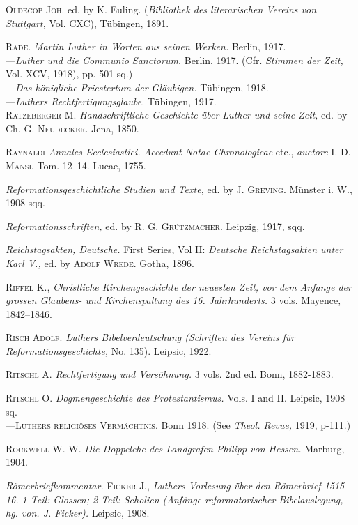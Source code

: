 \textsc{Oldecop Joh.} ed. by K. Euling. (\textit{Bibliothek des literarischen Vereins von
Stuttgart,} Vol. CXC), Tübingen, 1891.

\textsc{Rade.} \textit{Martin Luther in Worten aus seinen Werken.} Berlin, 1917. \\
---\textit{Luther und die Communio Sanctorum.} Berlin, 1917. (Cfr. \textit{Stimmen der
Zeit,} Vol. XCV, 1918), pp. 501 sq.) \\
---\textit{Das königliche Priestertum der Gläubigen.} Tübingen, 1918. \\
---\textit{Luthers Rechtfertigungsglaube.} Tübingen, 1917. \\

\textsc{Ratzeberger M.} \textit{Handschriftliche Geschichte über Luther und seine Zeit,}
ed. by Ch. \textsc{G. Neudecker.} Jena, 1850.

\textsc{Raynaldi} \textit{Annales Ecclesiastici. Accedunt Notae Chronologicae} etc., \textit{auctore}
\textsc{I. D. Mansi.} Tom. 12--14. Lucae, 1755.

\textit{Reformationsgeschichtliche Studien und Texte,} ed. by \textsc{J. Greving.} Münster i.
W., 1908 sqq.

\textit{Reformationsschriften,} ed. by \textsc{R. G. Grützmacher.} Leipzig, 1917, sqq.

\textit{Reichstagsakten, Deutsche.} First Series, Vol II: \textit{Deutsche Reichstagsakten
unter Karl V.,} ed. by \textsc{Adolf Wrede}. Gotha, 1896.

\textsc{Riffel K.}, \textit{Christliche Kirchengeschichte der neuesten Zeit, vor dem Anfange
der grossen Glaubens- und Kirchenspaltung des 16. Jahrhunderts.}
3 vols. Mayence, 1842--1846.

\textsc{Risch Adolf.} \textit{Luthers Bibelverdeutschung (Schriften des Vereins für Reformationsgeschichte,}
No. 135). Leipsic, 1922.

\textsc{Ritschl A.} \textit{Rechtfertigung und Versöhnung.} 3 vols. 2nd ed.
Bonn, 1882-1883.

\textsc{Ritschl O.} \textit{Dogmengeschichte des Protestantismus.} Vols. I and II. Leipsic,
1908 sq. \\
---\textsc{Luthers religiöses Vermächtnis.} Bonn 1918. (See \textit{Theol.
Revue,} 1919, p-111.)

\textsc{Rockwell W. W.} \textit{Die Doppelehe des Landgrafen Philipp von Hessen.} Marburg,
1904.

\textit{Römerbriefkommentar.} \textsc{Ficker J.}, \textit{Luthers Vorlesung über den Römerbrief
1515--16. 1 Teil: Glossen; 2 Teil: Scholien (Anfänge reformatorischer
Bibelauslegung, hg. von. J. Ficker).} Leipsic, 1908.

